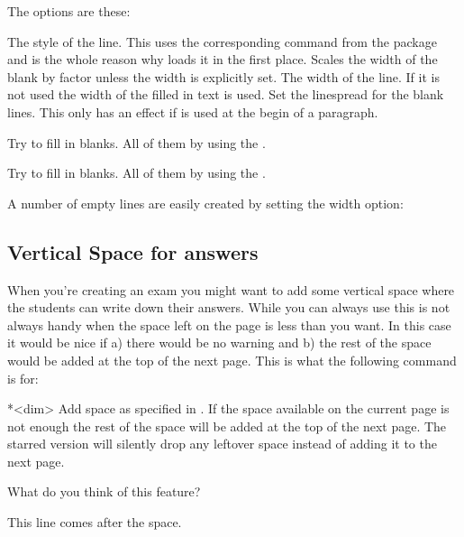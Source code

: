 \documentclass[DIV10,toc=index,toc=bib,numbers=noendperiod]{cnpkgdoc}
\begin{document}
The options are these:
\begin{beschreibung}
    The style of the line.  This uses the corresponding command from the
     package and is the whole reason why \ExSheets loads it in the
    first place.
    Scales the width of the blank by factor  unless the width is
    explicitly set.
  \Default{}
    The width of the line.  If it is not used the width of the filled in text
    is used.
    Set the linespread for the blank lines.  This only has an effect if
     is used at the begin of a paragraph.
\end{beschreibung}
\begin{beispiel}
 \begin{question}
  Try to fill in  blanks. All of them
   by using the 
  .
 \end{question}
 \begin{solution}[print]
  Try to fill in  blanks. All of them
   by using the 
  .
 \end{solution}
\end{beispiel}
A number of empty lines are easily created by setting the width option:
\begin{beispiel}
 
 \blank[width=4.8\linewidth,linespread=1.5]{}
\end{beispiel}

\subsection{Vertical Space for answers}
\noindent{}When you're creating an exam you might want to add
some vertical space where the students can write down their answers.  While
you can always use  this is not always handy when the space left
on the page is less than you want.  In this case it would be nice if a) there
would be no warning and b) the rest of the space would be added at the top of
the next page.  This is what the following command is for:
\begin{beschreibung}
  *{<dim>}\newline
    Add space as specified in . If the space available on the
    current page is not enough the rest of the space will be added at the top
    of the next page.  The starred version will silently drop any leftover
    space instead of adding it to the next page.
\end{beschreibung}
\begin{beispiel}
 \begin{question}
  What do you think of this feature?
  \examspace{3cm}
 \end{question}
 This line comes after the space.
\end{beispiel}
\end{document}
